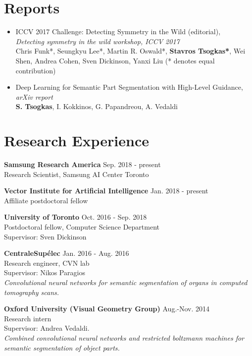 \documentclass[margin]{res}
\begin{document}
\begin{resume}
\section{Reports}
	\begin{itemize}
		\item ICCV 2017 Challenge: Detecting Symmetry in the Wild (editorial), \\
		\emph{Detecting symmetry in the wild workshop, ICCV 2017}\\
		Chris Funk*, Seungkyu Lee*, Martin R. Oswald*, \textbf{Stavros Tsogkas*}, 
		Wei Shen, Andrea Cohen, Sven Dickinson, Yanxi Liu 
		(* denotes equal contribution)
		\item  Deep Learning for Semantic Part Segmentation with High-Level Guidance, \emph{arXiv report}\\
		\textbf{S. Tsogkas}, I. Kokkinos, G. Papandreou, A. Vedaldi 
  \end{itemize}

\section{Research Experience} 
\textbf{Samsung Research America} \hfill Sep. 2018 - present\\
Research Scientist, Samsung AI Center Toronto

\textbf{Vector Institute for Artificial Intelligence} \hfill Jan. 2018 - present\\
Affiliate postdoctoral fellow

\textbf{University of Toronto} \hfill Oct. 2016 - Sep. 2018\\
Postdoctoral fellow, Computer Science Department\\
Supervisor: Sven Dickinson

\textbf{CentraleSup\'elec} \hfill Jan. 2016 - Aug. 2016\\
Research engineer, CVN lab \\
Supervisor: Nikos Paragios \\
\emph{Convolutional neural networks for semantic 
	segmentation of organs in computed tomography scans.
}

\textbf{Oxford University (Visual Geometry Group)} \hfill Aug.-Nov. 2014\\
Research intern \\
Supervisor: Andrea Vedaldi. \\
\emph{Combined convolutional neural networks 
	and restricted boltzmann machines for semantic segmentation 
	of object parts.
}



\end{resume}
\end{document}
